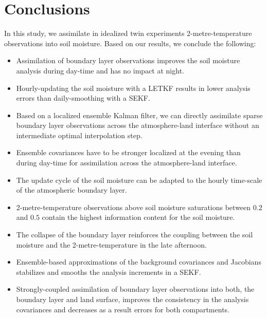 \documentclass[hess, manuscript]{copernicus}
\begin{document}
\section{Conclusions}
In this study, we assimilate in idealized twin experiments 2-metre-temperature observations into soil moisture.
Based on our results, we conclude the following:
\begin{itemize}
	\item Assimilation of boundary layer observations improves the soil moisture analysis during day-time and has no impact at night.
	\item Hourly-updating the soil moisture with a LETKF results in lower analysis errors than daily-smoothing with a SEKF.
	\item Based on a localized ensemble Kalman filter, we can directly assimilate sparse boundary layer observations across the atmosphere-land interface without an intermediate optimal interpolation step.
	\item Ensemble covariances have to be stronger localized at the evening than during day-time for assimilation across the atmosphere-land interface.
	\item The update cycle of the soil moisture can be adapted to the hourly time-scale of the atmospheric boundary layer.
	\item 2-metre-temperature observations above soil moisture saturations between $0.2$ and $0.5$ contain the highest information content for the soil moisture.
	\item The collapse of the boundary layer reinforces the coupling between the soil moisture and the 2-metre-temperature in the late afternoon.
	\item Ensemble-based approximations of the background covariances and Jacobians stabilizes and smooths the analysis increments in a SEKF.
	\item Strongly-coupled assimilation of boundary layer observations into both, the boundary layer and land surface, improves the consistency in the analysis covariances and decreases as a result errors for both compartments.
\end{itemize}



%

\appendix






\end{document}
